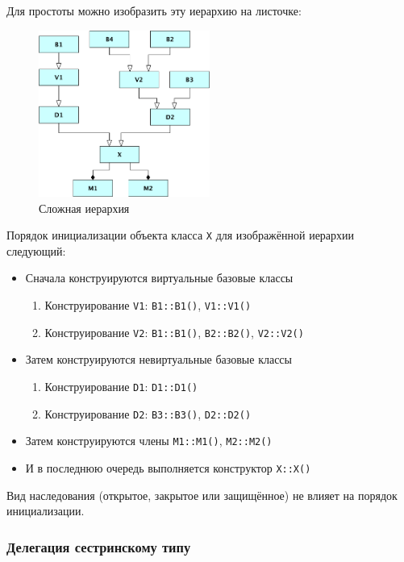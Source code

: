 \documentclass[a4paper,12pt,oneside]{article}
\begin{document}
Для простоты можно изобразить эту иерархию на листочке:

\begin{figure}[h!]
\centering
\includegraphics[width=0.5\textwidth]{illustrations/complexhier-crop.pdf}
\caption{Сложная иерархия}
\label{fig:complexhier-crop}
\end{figure}

Порядок инициализации объекта класса \lstinline!X! для изображённой иерархии следующий:

\begin{itemize}
\item Сначала конструируются виртуальные базовые классы
  \begin{enumerate}
  \item Конструирование \lstinline!V1!: \lstinline!B1::B1()!, \lstinline!V1::V1()!
  \item Конструирование \lstinline!V2!: \lstinline!B1::B1()!, \lstinline!B2::B2()!, \lstinline!V2::V2()!
  \end{enumerate}
\item Затем конструируются невиртуальные базовые классы
  \begin{enumerate}
  \item Конструирование \lstinline!D1!: \lstinline!D1::D1()!
  \item Конструирование \lstinline!D2!: \lstinline!B3::B3()!, \lstinline!D2::D2()!
  \end{enumerate}
\item Затем конструируются члены \lstinline!M1::M1()!, \lstinline!M2::M2()!
\item И в последнюю очередь выполняется конструктор \lstinline!X::X()!
\end{itemize}

Вид наследования (открытое, закрытое или защищённое) не влияет на порядок инициализации.

\subsubsection{Делегация сестринскому типу}
\end{document}
